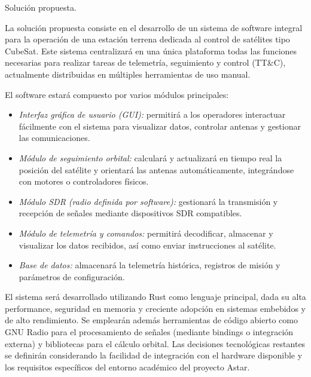 
Solución propuesta.

La solución propuesta consiste en el desarrollo de un sistema de software integral para la operación de una estación terrena dedicada al control de satélites tipo CubeSat. Este sistema centralizará en una única plataforma todas las funciones necesarias para realizar tareas de telemetría, seguimiento y control (TT\&C), actualmente distribuidas en múltiples herramientas de uso manual.

El software estará compuesto por varios módulos principales:

\begin{itemize}
    \item \textit{Interfaz gráfica de usuario (GUI):} permitirá a los operadores interactuar fácilmente con el sistema para visualizar datos, controlar antenas y gestionar las comunicaciones.
    
    \item \textit{Módulo de seguimiento orbital:} calculará y actualizará en tiempo real la posición del satélite y orientará las antenas automáticamente, integrándose con motores o controladores físicos.
    
    \item \textit{Módulo SDR (radio definida por software):} gestionará la transmisión y recepción de señales mediante dispositivos SDR compatibles.
    
    \item \textit{Módulo de telemetría y comandos:} permitirá decodificar, almacenar y visualizar los datos recibidos, así como enviar instrucciones al satélite.
    
    \item \textit{Base de datos:} almacenará la telemetría histórica, registros de misión y parámetros de configuración.
\end{itemize}

El sistema será desarrollado utilizando Rust como lenguaje principal, dada su alta performance, seguridad en memoria y creciente adopción en sistemas embebidos y de alto rendimiento. Se emplearán además herramientas de código abierto como GNU Radio para el procesamiento de señales (mediante bindings o integración externa) y bibliotecas para el cálculo orbital. Las decisiones tecnológicas restantes se definirán considerando la facilidad de integración con el hardware disponible y los requisitos específicos del entorno académico del proyecto Astar.

